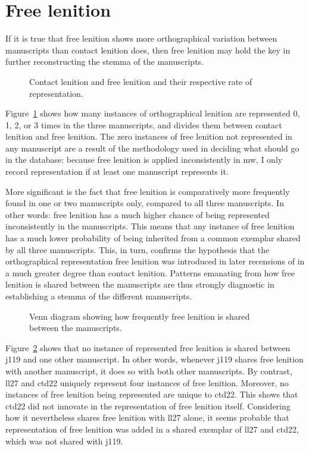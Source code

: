 \section{Free lenition}
\label{sec:points-where-one}
If it is true that free lenition shows more orthographical variation between manuscripts than contact lenition does, then free lenition may hold the key in further reconstructing the stemma of the manuscripts. 

\begin{figure}[h]
  \centering
  
  \caption{Contact lenition and free lenition and their respective rate of representation.}
  \label{fig:contfreelendewi}
\end{figure}

Figure~\ref{fig:contfreelendewi} shows how many instances of orthographical lenition are represented 0, 1, 2, or 3 times in the three manuscripts, and divides them between contact lenition and free lenition. The zero instances of free lenition not represented in any manuscript are a result of the methodology used in deciding what should go in the database: because free lenition is applied inconsistently in \gls{mw}, I only record representation if at least one manuscript represents it.

More significant is the fact that free lenition is comparatively more frequently found in one or two manuscripts only, compared to all three manuscripts. In other words: free lenition has a much higher chance of being represented inconsistently in the manuscripts. This means that any instance of free lenition has a much lower probability of being inherited from a common exemplar shared by all three manuscripts. This, in turn, confirms the hypothesis that the orthographical representation free lenition was introduced in later recensions of  in a much greater degree than contact lenition. Patterns  emanating from how free lenition is shared between the manuscripts are thus strongly diagnostic in establishing a stemma of the different manuscripts.

\begin{figure}[h]
  \centering
  
  \caption{Venn diagram showing how frequently free lenition is shared between  the manuscripts.}
  \label{fig:vennfreelendewi}
\end{figure}
Figure~\ref{fig:vennfreelendewi} shows that no instance of represented free lenition  is shared between \gls{j119} and one other manuscript. In other words, whenever \gls{j119} shares free lenition with another manuscript, it does so with both other manuscripts. By contrast, \gls{ll27} and \gls{ctd22} uniquely represent four instances of free lenition. Moreover, no instances of free lenition being represented are unique to \gls{ctd22}. This shows that \gls{ctd22} did not innovate in the representation of free lenition itself. Considering how it nevertheless shares free lenition with \gls{ll27} alone, it seems probable that representation of free lenition was added in a shared exemplar of \gls{ll27} and \gls{ctd22}, which was not shared with \gls{j119}.


